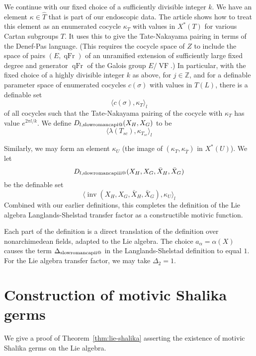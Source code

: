 \documentclass[12pt]{amsart}
\makeatletter
\newcommand*{\rom}[1]{\text{\expandafter\@slowromancap\romannumeral #1@}}
\newcommand{\op}[1]{\operatorname{#1}}
\newcommand{\ring}[1]{{\mathbb #1}}
\def\VF{{\op{VF}}}
\theoremstyle{plain}
\theoremstyle{definition}
\makeatother
\begin{document}
We continue with our fixed choice of a sufficiently divisible integer
$k$.  We have an element $\kappa\in \hat T$ that is part of our
endoscopic data.  The article \cite{CHL} shows how to treat this
element as an enumerated cocycle $\kappa_T$ with values in $X^*(T)$
for various Cartan subgroups $T$.  It uses this to give the
Tate-Nakayama pairing in terms of the Denef-Pas language.  (This
requires the cocycle space of $Z$ to include the space of pairs
$(E,\op{qFr})$ of an unramified extension of sufficiently large fixed
degree and generator $\op{qFr}$ of the Galois group $E/\VF$.)  In
particular, with the fixed choice of a highly divisible integer $k$ as
above, for $j\in \ring{Z}$, and for a definable parameter space of
enumerated cocycles $c(\sigma)$ with values in $T(L)$, there is a
definable set
\[
\langle c(\sigma),\kappa_T\rangle_l
\]
of all cocycles such that the Tate-Nakayama pairing of the cocycle with
$\kappa_T$ has value $e^{2\pi l/k}$.  We define $D_{l,\rom1}(X_H,X_G)$ to
be
\[
\langle \lambda(T_{sc}),\kappa_{T_{sc}}\rangle_l
\]

Similarly, we may form an element $\kappa_U$ (the image of
$(\kappa_T,\kappa_{\bar T})$ in $X^*(U)$).  We let
\[
D_{l,\rom{3}}(X_H,X_G,\bar X_H,\bar X_G)
\]
 be the definable set
\[
\langle \op{inv}(X_H,X_G,\bar
X_H,\bar X_G),\kappa_{U}\rangle_l
\]
Combined with our earlier definitions, this completes the definition
of the Lie algebra Langlands-Shelstad transfer factor as a
constructible motivic function.


Each part of the definition is a direct translation of the definition
over nonarchimedean fields, adapted to the Lie algebra.  The choice
$a_\alpha = \alpha(X)$ causes the term $\Delta_{\rom2}$ in the
Langlands-Shelstad definition to equal $1$.  For the Lie algebra
transfer factor, we may take $\Delta_{2}=1$.

\section{Construction of motivic Shalika germs}

We give a proof of Theorem~\ref{thm:lie-shalika} asserting the
existence of motivic Shalika germs on the Lie algebra.
\end{document}
